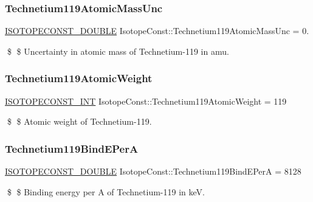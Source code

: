 \subsubsection{\texorpdfstring{Technetium119\+Atomic\+Mass\+Unc}{Technetium119AtomicMassUnc}}
{\footnotesize\ttfamily \mbox{\hyperlink{group___isotope_const-_macros_ga8f45a7272ce02c0b4c65c44636ed719a}{I\+S\+O\+T\+O\+P\+E\+C\+O\+N\+S\+T\+\_\+\+D\+O\+U\+B\+LE}} Isotope\+Const\+::\+Technetium119\+Atomic\+Mass\+Unc = 0.}

\$ \$ Uncertainty in atomic mass of Technetium-\/119 in amu. \mbox{\label{group___isotope_const-_technetium-_tc119_ga41fb256c9e9f851bf3481b5e00d448b8}} 
\subsubsection{\texorpdfstring{Technetium119\+Atomic\+Weight}{Technetium119AtomicWeight}}
{\footnotesize\ttfamily \mbox{\hyperlink{group___isotope_const-_macros_ga5f18360b3e99483a35c32d789e62621c}{I\+S\+O\+T\+O\+P\+E\+C\+O\+N\+S\+T\+\_\+\+I\+NT}} Isotope\+Const\+::\+Technetium119\+Atomic\+Weight = 119}

\$ \$ Atomic weight of Technetium-\/119. \mbox{\label{group___isotope_const-_technetium-_tc119_ga858715d0c2c950dc9b76e9cea908e904}} 
\subsubsection{\texorpdfstring{Technetium119\+Bind\+E\+PerA}{Technetium119BindEPerA}}
{\footnotesize\ttfamily \mbox{\hyperlink{group___isotope_const-_macros_ga8f45a7272ce02c0b4c65c44636ed719a}{I\+S\+O\+T\+O\+P\+E\+C\+O\+N\+S\+T\+\_\+\+D\+O\+U\+B\+LE}} Isotope\+Const\+::\+Technetium119\+Bind\+E\+PerA = 8128}

\$ \$ Binding energy per A of Technetium-\/119 in keV. \mbox{\label{group___isotope_const-_technetium-_tc119_ga1fdbe432ab150d3185a134b035e23a64}} 
